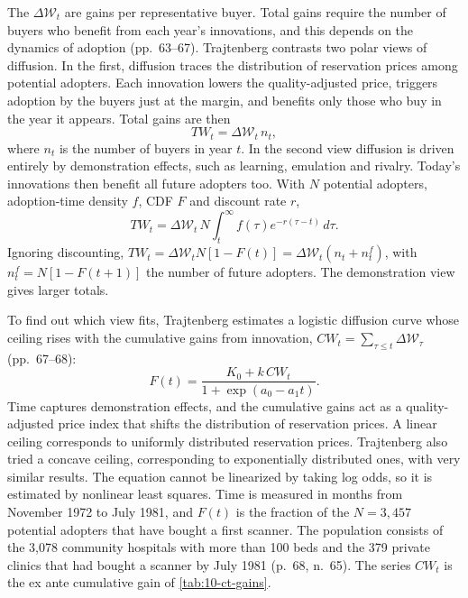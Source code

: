 The $\Delta\mathcal{W}_t$ are gains per representative buyer. Total gains require the number of buyers who benefit
from each year's innovations, and this depends on the dynamics of adoption (pp.~63--67). Trajtenberg contrasts two
polar views of diffusion. In the first, diffusion traces the distribution of reservation prices among potential
adopters. Each innovation lowers the quality-adjusted price, triggers adoption by the buyers just at the margin, and
benefits only those who buy in the year it appears. Total gains are then
\begin{equation}\label{eq:10-traj-TW-reservation}
TW_t = \Delta\mathcal{W}_t\,n_t ,
\end{equation}
where $n_t$ is the number of buyers in year $t$. In the second view diffusion is driven entirely by demonstration
effects, such as learning, emulation and rivalry. Today's innovations then benefit all future adopters too. With $N$
potential adopters, adoption-time density $f$, CDF $F$ and discount rate $r$,
\begin{equation}\label{eq:10-traj-TW-demo}
TW_t = \Delta\mathcal{W}_t\,N\int_t^{\infty}f(\tau)e^{-r(\tau - t)}\,d\tau .
\end{equation}
Ignoring discounting, $TW_t = \Delta\mathcal{W}_tN[1 - F(t)] = \Delta\mathcal{W}_t(n_t + n^f_t)$, with
$n^f_t = N[1 - F(t+1)]$ the number of future adopters. The demonstration view gives larger totals.

 To find out which view fits, Trajtenberg estimates a logistic diffusion curve whose
ceiling rises with the cumulative gains from innovation, $CW_t = \sum_{\tau\le t}\Delta\mathcal{W}_\tau$ (pp.~67--68):
\begin{equation}\label{eq:10-traj-diffusion}
F(t) = \frac{K_0 + k\,CW_t}{1 + \exp(a_0 - a_1t)} .
\end{equation}
Time captures demonstration effects, and the cumulative gains act as a quality-adjusted price index that shifts the
distribution of reservation prices. A linear ceiling corresponds to uniformly distributed reservation prices.
Trajtenberg also tried a concave ceiling, corresponding to exponentially distributed ones, with very similar results.
The equation cannot be linearized by taking log odds, so it is estimated by nonlinear least squares. Time is measured in
months from November 1972 to July 1981, and $F(t)$ is the fraction of the $N = 3{,}457$ potential adopters that have
bought a first scanner. The population consists of the 3,078 community hospitals with more than 100 beds and the 379
private clinics that had bought a scanner by July 1981 (p.~68, n.~65). The series $CW_t$ is the ex ante cumulative
gain of \cref{tab:10-ct-gains}.

